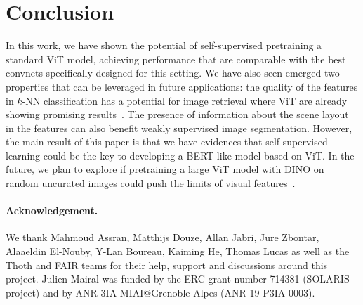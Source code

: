 \documentclass[10pt,twocolumn,letterpaper]{article}
\def\OURS{DINO\xspace}
\begin{document}
\begin{abstract}

   
\end{abstract}








\section{Conclusion}

In this work, we have shown the potential of self-supervised pretraining a standard ViT model, achieving performance that are comparable with the best convnets specifically designed for this setting.
We have also seen emerged two properties that can be leveraged in future applications:
the quality of the features in $k$-NN classification has a potential for image retrieval where ViT are already showing promising results~\cite{el2021training}.
The presence of information about the scene layout in the features can also benefit weakly supervised image segmentation.
However, the main result of this paper is that we have evidences that self-supervised learning could be the key to developing a BERT-like model based on ViT.
In the future, we plan to explore if pretraining a large ViT model with \OURS on random uncurated images could push the limits of visual features~\cite{goyal2021self}.

\paragraph{Acknowledgement.}
We thank Mahmoud Assran, Matthijs Douze, Allan Jabri, Jure Zbontar, Alaaeldin El-Nouby, Y-Lan Boureau, Kaiming He, Thomas Lucas as well as the Thoth and FAIR teams for their help, support and discussions around this project.
Julien Mairal was funded by the ERC grant number 714381 (SOLARIS project) and by ANR 3IA MIAI@Grenoble Alpes (ANR-19-P3IA-0003).

{\small


}


\end{document}
